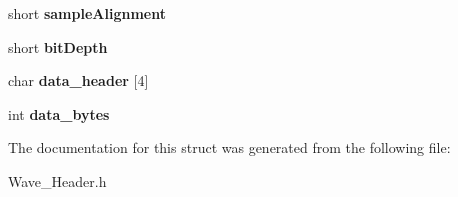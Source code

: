 \begin{DoxyCompactItemize}
short {\bfseries sample\+Alignment}
\item 
\mbox{\label{structWave__Header_a84a83027dfbce3d40ef313e2e51fb14c}} 
short {\bfseries bit\+Depth}
\item 
\mbox{\label{structWave__Header_a4e2bc40c58a9da8bbe53b14e9f822153}} 
char {\bfseries data\+\_\+header} \mbox{[}4\mbox{]}
\item 
\mbox{\label{structWave__Header_a30a52cd01475ca214d183dfb1d6c4230}} 
int {\bfseries data\+\_\+bytes}
\end{DoxyCompactItemize}


The documentation for this struct was generated from the following file\+:\begin{DoxyCompactItemize}
\item 
Wave\+\_\+\+Header.\+h\end{DoxyCompactItemize}
